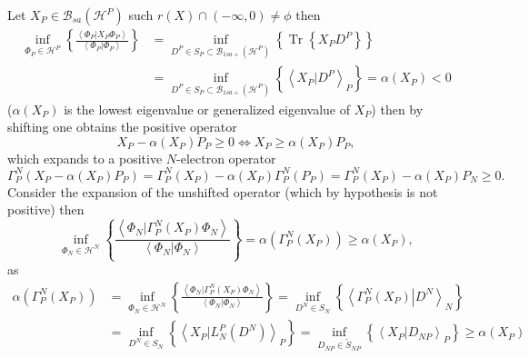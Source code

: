 \documentclass[aps,preprint]{revtex4}%
\begin{document}
Let $X_{P}\in\mathcal{B}_{sa}\left(  \mathcal{H}^{P}\right)  $ such $r\left(
X\right)  \cap\left(  -\infty,0\right)  \neq\phi$ then
\begin{align}
\inf_{\Phi_{P}\in\mathcal{H}^{P}}\left\{  \frac{\left\langle \left.  \Phi
_{P}\right\vert X_{P}\Phi_{P}\right\rangle }{\left\langle \left.  \Phi
_{P}\right\vert \Phi_{P}\right\rangle }\right\}   &  =\inf_{D^{P}\in
S_{P}\subset\mathcal{B}_{1sa+}\left(  \mathcal{H}^{P}\right)  }\left\{
\operatorname*{Tr}\left\{  X_{P}D^{P}\right\}  \right\} \nonumber\\
&  =\inf_{D^{P}\in S_{P}\subset\mathcal{B}_{1sa+}\left(  \mathcal{H}%
^{P}\right)  }\left\{  \left\langle \left.  X_{P}\right\vert D^{P}%
\right\rangle _{P}\right\}  =\alpha\left(  X_{P}\right)  <0
\end{align}
($\alpha\left(  X_{P}\right)  $ is the lowest eigenvalue or generalized
eigenvalue of $X_{P}$) then by shifting one obtains the positive operator
\begin{equation}
X_{P}-\alpha\left(  X_{P}\right)  P_{P}\geq0\Leftrightarrow X_{P}\geq
\alpha\left(  X_{P}\right)  P_{P},
\end{equation}
which expands to a positive $N$-electron operator%
\begin{equation}
\Gamma_{P}^{N}\left(  X_{P}-\alpha\left(  X_{P}\right)  P_{P}\right)
=\Gamma_{P}^{N}\left(  X_{P}\right)  -\alpha\left(  X_{P}\right)  \Gamma
_{P}^{N}\left(  P_{P}\right)  =\Gamma_{P}^{N}\left(  X_{P}\right)
-\alpha\left(  X_{P}\right)  P_{N}\geq0.
\end{equation}
Consider the expansion of the unshifted operator (which by hypothesis is not
positive) then
\begin{equation}
\inf_{\Phi_{N}\in\mathcal{H}^{N}}\left\{  \frac{\left\langle \left.  \Phi
_{N}\right\vert \Gamma_{P}^{N}\left(  X_{P}\right)  \Phi_{N}\right\rangle
}{\left\langle \left.  \Phi_{N}\right\vert \Phi_{N}\right\rangle }\right\}
=\alpha\left(  \Gamma_{P}^{N}\left(  X_{P}\right)  \right)  \geq\alpha\left(
X_{P}\right)  ,
\end{equation}
as%
\begin{align}
\alpha\left(  \Gamma_{P}^{N}\left(  X_{P}\right)  \right)   &  =\inf_{\Phi
_{N}\in\mathcal{H}^{N}}\left\{  \frac{\left\langle \left.  \Phi_{N}\right\vert
\Gamma_{P}^{N}\left(  X_{P}\right)  \Phi_{N}\right\rangle }{\left\langle
\left.  \Phi_{N}\right\vert \Phi_{N}\right\rangle }\right\}  =\inf_{D^{N}\in
S_{N}}\left\{  \left\langle \left.  \Gamma_{P}^{N}\left(  X_{P}\right)
\right\vert D^{N}\right\rangle _{N}\right\} \nonumber\\
&  =\inf_{D^{N}\in S_{N}}\left\{  \left\langle \left.  X_{P}\right\vert
L_{N}^{P}\left(  D^{N}\right)  \right\rangle _{P}\right\}  =\inf_{D_{NP}%
\in\tilde{S}_{NP}}\left\{  \left\langle \left.  X_{P}\right\vert
D_{NP}\right\rangle _{P}\right\}  \geq\alpha\left(  X_{P}\right)
\end{align}
\end{document}
